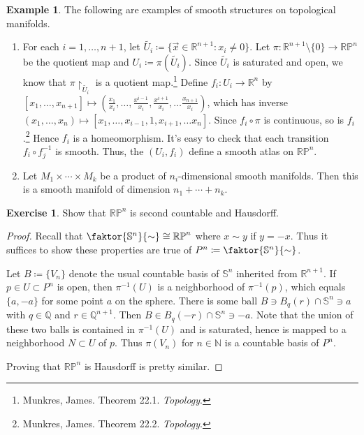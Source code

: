 \documentclass[10pt,letterpaper,cm]{nupset}
\theoremstyle{definition}
\newtheorem{exmp}[definition]{Example}
\theoremstyle{theorem}
\newtheorem{exercise}[definition]{Exercise}
\theoremstyle{remark}
\newcommand{\N}{\mathbb N}
\newcommand{\Q}{\mathbb Q}
\newcommand{\R}{\mathbb R}
\newcommand{\RP}{\mathbb{RP}}
\renewcommand{\S}{\mathbb S}
\newcommand{\1}{\mathbf{1}}
\newcommand{\x}{\vec x}
\newcommand{\0}{\vec 0}
\begin{document}
\begin{exmp}{The following are examples of smooth structures on topological manifolds.}
\begin{enumerate}
\item For each $i = 1, \ldots, n+1$, let $\tilde{U_i}\coloneqq  \{\x \in \R^{n+1} : x_i \ne 0\}$. Let $\pi: \R^{n+1} \setminus\{0\} \to \RP^n$ be the quotient map and $U_i \coloneqq  \pi\left(\tilde{U_i}\right)$. Since $\tilde{U_i}$ is saturated and open, we know that $\pi \restriction_{\tilde{U_i}}$ is a quotient map.\footnote{Munkres, James. Theorem 22.1. \textit{Topology}.} Define $f_i : U_i \to \R^n$ by $[x_1, \ldots, x_{n+1}] \mapsto \left(\frac{x_1}{x_i}, \ldots, \frac{x^{i-1}}{x_i}, \frac{x^{i+1}}{x_i}, \ldots \frac{x_{n+1}}{x_i}\right)$, which has inverse $(x_1, \ldots, x_n) \mapsto \left[x_1, \ldots, x_{i-1}, 1, x_{i+1}, \ldots x_n\right]$. Since $f_i \circ \pi$ is continuous, so is $f_i$.\footnote{Munkres, James. Theorem 22.2. \textit{Topology}.} Hence $f_i$ is a homeomorphism. It's easy to check that each transition $f_i \circ f_j^{-1}$ is smooth. Thus, the $(U_i, f_i)$ define a smooth atlas on $\RP^n$.
\item Let $M_1 \times \cdots \times M_k$ be a product of $n_i$-dimensional smooth manifolds. Then this is a smooth manifold of dimension $n_1 + \cdots + n_k$.
\end{enumerate}
\end{exmp}

\begin{exercise} 
Show that $\RP^n$ is second countable and Hausdorff. 
\end{exercise}
\begin{proof}
Recall that $\faktor{\S^n}{\sim} \cong \RP^n$ where $x \sim y$ if $y = -x$. Thus it suffices to show these properties are true of $P^n\coloneqq  \faktor{\S^n}{\sim}$. 

\medskip


Let $B\coloneqq \{V_n\}$ denote the usual countable basis of $\S^n$ inherited from $\R^{n+1}$. If $p\in U\subset P^n$ is open, then $\pi^{-1}(U)$ is a neighborhood of $\pi^{-1}(p)$, which equals $\{a, -a\}$ for some point $a$ on the sphere.  There is some ball $B \ni B_q(r) \cap \S^n \ni a$ with $q\in \Q$ and $r \in \Q^{n+1}$. Then $B \in B_q(-r) \cap \S^n \ni -a$. Note that the union of these two balls is contained in $\pi^{-1}(U)$ and is saturated, hence is mapped to a neighborhood $N \subset U$ of $p$. Thus $\pi(V_n)$ for $n\in \N$ is a countable basis of $P^n$.

\medskip

 Proving that $\RP^n$ is Hausdorff is pretty similar.
\end{proof}
\end{document}
